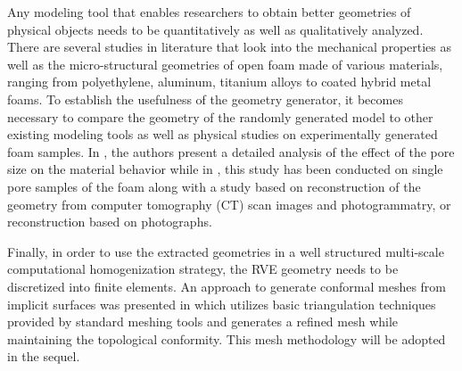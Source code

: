 Any modeling tool that enables researchers to obtain better geometries of physical objects needs to be quantitatively as well as qualitatively analyzed. There are several studies in literature that look into the mechanical properties as well as the micro-structural geometries of open foam made of various materials, ranging from polyethylene, aluminum, titanium alloys to coated hybrid metal foams\cite{zhouInvestigationMicrostructureStrength2002,zardiackasStructureMetallurgyMechanical2001,sypeckStructureDeformationAluminum1998,stormInfluenceCurvedStruts2015,pangSynthesisMechanicalProperties2012}. To establish the usefulness of the geometry generator, it becomes necessary to compare the geometry of the randomly generated model to other existing modeling tools as well as physical studies on experimentally generated foam samples. In \cite{jungMicrostructuralCharacterisationExperimental2017}, the authors present a detailed analysis of the effect of the pore size on the material behavior while in \cite{heinzeExperimentalNumericalInvestigation2018}, this study has been conducted on single pore samples of the foam along with a study based on reconstruction of the geometry from computer tomography (CT) scan images and photogrammatry, or reconstruction based on photographs.

Finally, in order to use the extracted geometries in a well structured multi-scale computational homogenization strategy, the RVE geometry needs to be discretized into finite elements. An approach to generate conformal meshes from implicit surfaces was presented in \cite{ehabmoustafakamelIntegratedApproachConformal2019} which utilizes basic triangulation techniques provided by standard meshing tools and generates a refined mesh while maintaining the topological conformity. This mesh methodology will be adopted in the sequel.

